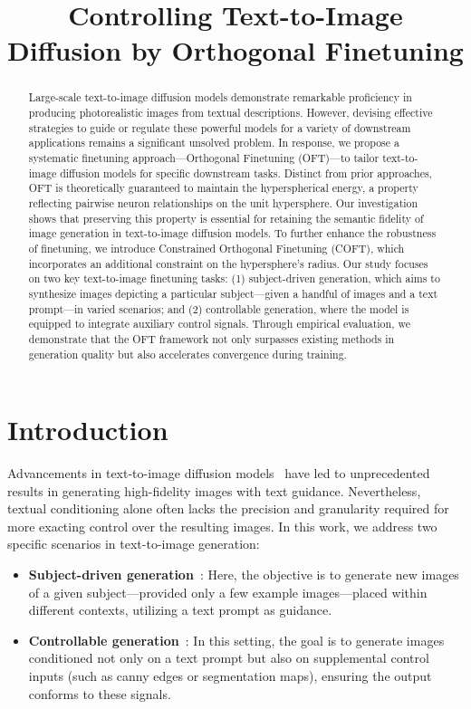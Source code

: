 \title{Controlling Text-to-Image Diffusion by Orthogonal Finetuning}

\begin{abstract}
Large-scale text-to-image diffusion models demonstrate remarkable proficiency in producing photorealistic images from textual descriptions. However, devising effective strategies to guide or regulate these powerful models for a variety of downstream applications remains a significant unsolved problem. In response, we propose a systematic finetuning approach—Orthogonal Finetuning (OFT)—to tailor text-to-image diffusion models for specific downstream tasks. Distinct from prior approaches, OFT is theoretically guaranteed to maintain the hyperspherical energy, a property reflecting pairwise neuron relationships on the unit hypersphere. Our investigation shows that preserving this property is essential for retaining the semantic fidelity of image generation in text-to-image diffusion models. To further enhance the robustness of finetuning, we introduce Constrained Orthogonal Finetuning (COFT), which incorporates an additional constraint on the hypersphere's radius. Our study focuses on two key text-to-image finetuning tasks: (1) subject-driven generation, which aims to synthesize images depicting a particular subject—given a handful of images and a text prompt—in varied scenarios; and (2) controllable generation, where the model is equipped to integrate auxiliary control signals. Through empirical evaluation, we demonstrate that the OFT framework not only surpasses existing methods in generation quality but also accelerates convergence during training.
\end{abstract}

\section{Introduction}

Advancements in text-to-image diffusion models~\cite{saharia2022photorealistic,ramesh2022hierarchical,rombach2022high} have led to unprecedented results in generating high-fidelity images with text guidance. Nevertheless, textual conditioning alone often lacks the precision and granularity required for more exacting control over the resulting images. In this work, we address two specific scenarios in text-to-image generation:

\begin{itemize}[leftmargin=*,nosep]

    \item \textbf{Subject-driven generation}~\cite{ruiz2023dreambooth}: Here, the objective is to generate new images of a given subject—provided only a few example images—placed within different contexts, utilizing a text prompt as guidance.
    \item \textbf{Controllable generation}~\cite{zhang2023adding,mou2023t2i}: In this setting, the goal is to generate images conditioned not only on a text prompt but also on supplemental control inputs (such as canny edges or segmentation maps), ensuring the output conforms to these signals.
\end{itemize}

